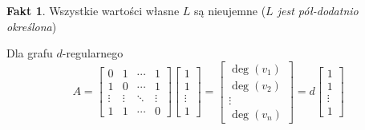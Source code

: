 \documentclass[a4paper,12pt]{article}
\theoremstyle{definition}%
\newtheorem{fact}{Fakt} %
\theoremstyle{definition}
\theoremstyle{problem}
\begin{document}
\begin{fact}
Wszystkie wartości własne $L$ są nieujemne (\textit{$L$ jest pół-dodatnio określona})
\end{fact}

Dla grafu $d$-regularnego
$$A=\begin{bmatrix}
0&1&\cdots &1\\
1&0&\cdots &1\\
\vdots &\vdots & \ddots & \vdots \\
1&1&\cdots & 0
\end{bmatrix}\begin{bmatrix}
1\\1\\\vdots \\ 1
\end{bmatrix}=\begin{bmatrix}
\deg (v_1) \\\deg (v_2) \\\vdots \\\deg (v_n)
\end{bmatrix}=d\begin{bmatrix}
1\\1\\\vdots \\ 1
\end{bmatrix}$$
\end{document}
